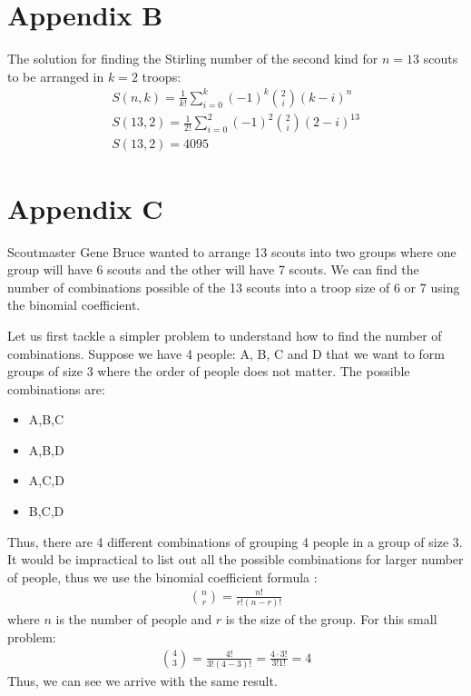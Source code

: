 \documentclass{amsart}
\theoremstyle{definition}
\theoremstyle{remark}
\numberwithin{equation}{section}
\begin{document}
\section*{Appendix B}
The solution for finding the Stirling number of the second kind for $n = 13$ scouts to be arranged in $k = 2$ troops:
\begin{gather*}
	S(n,k) = \frac{1}{k!} \sum_{i=0}^{k}(-1)^k {2 \choose i} (k - i)^{n} \\
	S(13,2) = \frac{1}{2!} \sum_{i=0}^{2}(-1)^2 {2 \choose i} (2 - i)^{13} \\
	S(13, 2) = 4095
\end{gather*}

\clearpage

\section*{Appendix C}
Scoutmaster Gene Bruce wanted to arrange 13 scouts into two groups where one group will have 6 scouts and the other will have 7 scouts. We can find the number of combinations possible of the 13 scouts into a troop size of 6 or 7 using the binomial coefficient.

Let us first tackle a simpler problem to understand how to find the number of combinations. Suppose we have 4 people: A, B, C and D that we want to form groups of size 3 where the order of people does not matter. The possible combinations are:

\begin{itemize}
	\item A,B,C	
	\item A,B,D
	\item A,C,D	
	\item B,C,D
\end{itemize}
Thus, there are 4 different combinations of grouping 4 people in a group of size 3. It would be impractical to list out all the possible combinations for larger number of people, thus we use the binomial coefficient formula \cite{F}:
\begin{gather*}
	\binom{n}{r} = \frac{n!}{r!(n-r)!}
\end{gather*}
where $n$ is the number of people and $r$ is the size of the group. For this small problem:
\begin{gather*}
	\binom{4}{3} = \frac{4!}{3!(4-3)!} = \frac{4\cdot3!}{3!1!} = 4
\end{gather*} 
Thus, we can see we arrive with the same result.
\end{document}
